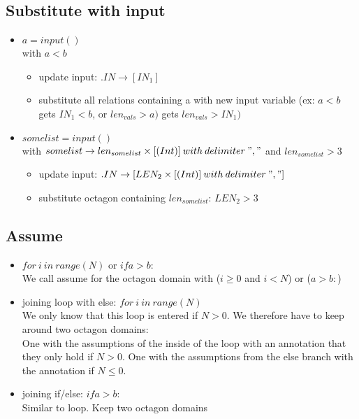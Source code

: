 \documentclass[11pt]{article}
\begin{document}
\subsection{Substitute with input}

\begin{itemize}
  \item $a = input()$\\ with $a < b$
  \begin{itemize}
    \item update input: $.IN \rightarrow [IN_1]$
    \item substitute all relations containing a with new input variable (ex: $a < b$ gets $IN_1 < b$, or $len_{vals} > a)$ gets $len_{vals} > IN_1)$
  \end{itemize}
  \item $somelist = input()$\\ with $somelist \rightarrow len_{somelist} \times [(Int)]\:with\:delimiter\:","$ and $len_{somelist} > 3$
  \begin{itemize}
    \item update input: $.IN \rightarrow [LEN_2 \times [(Int)]\:with\:delimiter\:","]$
    \item substitute octagon containing $len_{somelist}$: $LEN_2 > 3$
  \end{itemize}
\end{itemize}

\subsection{Assume}

\begin{itemize}
  \item $for\:i\:in\:range(N)$ or $if a > b:$\\
  We call assume for the octagon domain with ($i \geq 0$ and $i < N$) or ($a > b:$)
  \item joining loop with else: $for\:i\:in\:range(N)$\\
  We only know that this loop is entered if $N > 0$. We therefore have to keep around two octagon domains:\\
  One with the assumptions of the inside of the loop with an annotation that they only hold if $N > 0$. One with the assumptions from the else branch with the annotation if $N \leq 0$.
  \item joining if/else: $if a > b:$\\
  Similar to loop. Keep two octagon domains
\end{itemize}
\end{document}
